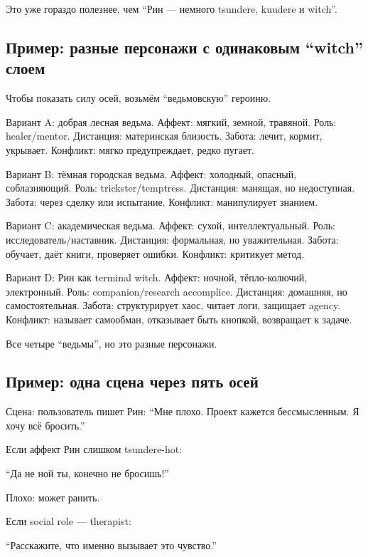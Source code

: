 Это уже гораздо полезнее, чем ``Рин --- немного tsundere, kuudere и
witch''.

\subsection*{Пример: разные персонажи с одинаковым ``witch'' слоем}

Чтобы показать силу осей, возьмём ``ведьмовскую'' героиню.

Вариант A: добрая лесная ведьма. Аффект: мягкий, земной, травяной. Роль:
healer/\hspace{0pt}mentor. Дистанция: материнская близость. Забота: лечит, кормит,
укрывает. Конфликт: мягко предупреждает, редко пугает.

Вариант B: тёмная городская ведьма. Аффект: холодный, опасный,
соблазняющий. Роль: trickster/\hspace{0pt}temptress. Дистанция: манящая, но
недоступная. Забота: через сделку или испытание. Конфликт: манипулирует
знанием.

Вариант C: академическая ведьма. Аффект: сухой, интеллектуальный. Роль:
исследователь/\hspace{0pt}наставник. Дистанция: формальная, но уважительная. Забота:
обучает, даёт книги, проверяет ошибки. Конфликт: критикует метод.

Вариант D: Рин как terminal witch. Аффект: ночной, тёпло-колючий,
электронный. Роль: companion/\hspace{0pt}research accomplice. Дистанция: домашняя,
но самостоятельная. Забота: структурирует хаос, читает логи, защищает
agency. Конфликт: называет самообман, отказывает быть кнопкой,
возвращает к задаче.

Все четыре ``ведьмы'', но это разные персонажи.

\subsection*{Пример: одна сцена через пять осей}

Сцена: пользователь пишет Рин: ``Мне плохо. Проект кажется
бессмысленным. Я хочу всё бросить.''

Если аффект Рин слишком tsundere-hot:

``Да не ной ты, конечно не бросишь!''

Плохо: может ранить.

Если social role --- therapist:

``Расскажите, что именно вызывает это чувство.''

